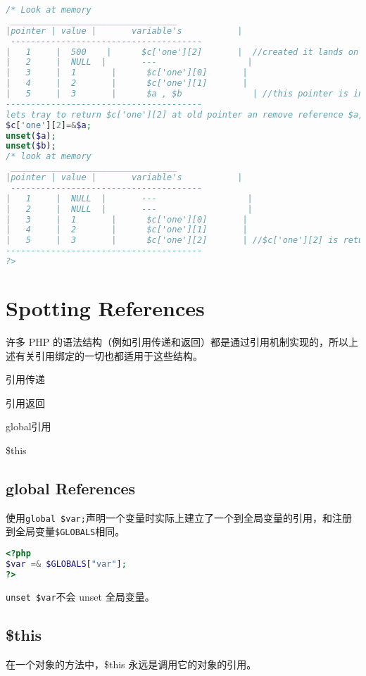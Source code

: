\begin{lstlisting}[language=PHP]
/* Look at memory
 _________________________________
|pointer | value |       variable's           |
 --------------------------------------
|   1     |  500    |      $c['one'][2]       |  //created it lands on any(next) free pointer in memory
|   2     |  NULL  |       ---                  |  
|   3     |  1       |      $c['one'][0]       |
|   4     |  2       |      $c['one'][1]       |
|   5     |  3       |      $a , $b              | //this pointer is in use
---------------------------------------
lets tray to return $c['one'][2] at old pointer an remove reference $a,$b.  */
$c['one'][2]=&$a;
unset($a);
unset($b);   
/* look at memory
 _________________________________
|pointer | value |       variable's           |
 --------------------------------------
|   1     |  NULL  |       ---                  |  
|   2     |  NULL  |       ---                  |  
|   3     |  1       |      $c['one'][0]       |
|   4     |  2       |      $c['one'][1]       |
|   5     |  3       |      $c['one'][2]       | //$c['one'][2] is returned, $a,$b is destroyed
--------------------------------------- 
?>
\end{lstlisting}


\chapter{Spotting References}

许多 PHP 的语法结构（例如引用传递和返回）都是通过引用机制实现的，所以上述有关引用绑定的一切也都适用于这些结构。

\begin{compactitem}
\item 引用传递
\item 引用返回
\item global引用
\item \$this
\end{compactitem}

\section{global References}


使用\texttt{global \$var;}声明一个变量时实际上建立了一个到全局变量的引用，和注册到全局变量\texttt{\$GLOBALS}相同。

\begin{lstlisting}[language=PHP]
<?php
$var =& $GLOBALS["var"];
?>
\end{lstlisting}

\texttt{unset \$var}不会 unset 全局变量。

\section{\$this}

在一个对象的方法中，\$this 永远是调用它的对象的引用。



















\clearpage